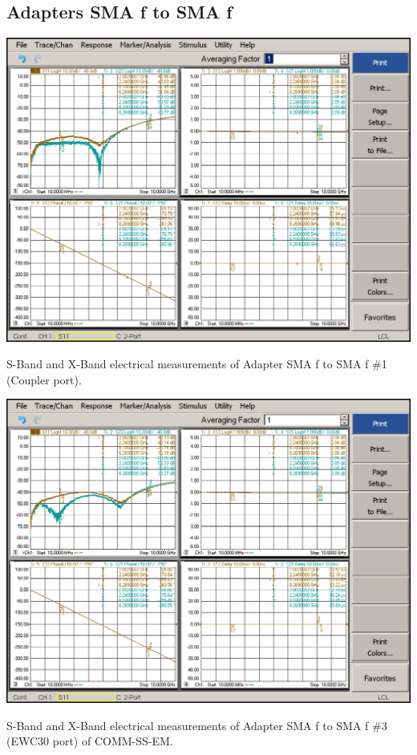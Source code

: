 \subsection{Adapters SMA f to SMA f}

\begin{table}[H]
	\centering
	\includegraphics[width=0.8\linewidth]{figuras/measures/Adapter1_10M_10G}
	\caption{S-Band and X-Band electrical measurements of Adapter SMA f to SMA f \#1 (Coupler port).}
	\label{fig:Adapter1}
\end{table}


\begin{table}[H]
	\centering
	\includegraphics[width=0.8\linewidth]{figuras/measures/Adapter3_10M_10G}
	\caption{S-Band and X-Band electrical measurements of Adapter SMA f to SMA f \#3 (EWC30 port) of COMM-SS-EM.}
	\label{fig:Adapter3}
\end{table}


